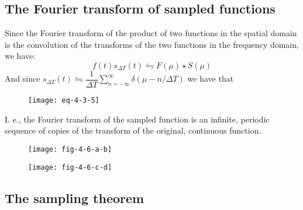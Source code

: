 
\subsection{The Fourier transform of sampled functions}


\begin{frame}
Since the Fourier transform of the product of two functions
in the spatial domain is the convolution of the transforms of the two functions in the frequency domain, we have:
\begin{equation}
f(t) s_{\Delta T}(t) \leftrightharpoons F(\mu) \star S(\mu)
\end{equation}
And since $s_{\Delta T}(t) \leftrightharpoons \dfrac{1}{\Delta T} \sum_{n=-\infty}^{\infty} \delta(\mu - n/\Delta T)$
we have that
\end{frame}


\begin{frame}
\begin{figure}
\centering
\texttt{[image: eq-4-3-5]}
\end{figure}
I. e., the Fourier transform of the sampled function is an infinite, periodic sequence of copies of the transform of the original, continuous function.
\end{frame}


\begin{frame}
\begin{figure}
\centering
\texttt{[image: fig-4-6-a-b]}
\end{figure}
\begin{figure}
\centering
\texttt{[image: fig-4-6-c-d]}
\end{figure}
\end{frame}


\subsection{The sampling theorem}

